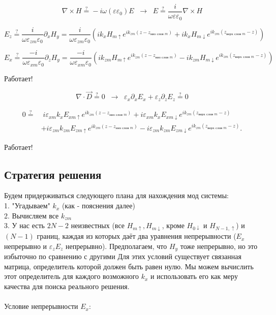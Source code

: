 \documentclass{article}
\begin{document}
$$
\nabla \times H \stackrel{?}{=} -i \omega (\varepsilon \varepsilon_0) E \;\; \rightarrow \;\; E \stackrel{?}{=} \frac{i}{\omega \varepsilon \varepsilon_0} \nabla \times H
$$

$$
E_z \stackrel{?}{=} \frac{i}{\omega \varepsilon_{zm} \varepsilon_0} \partial_x H_y
= \frac{i}{\omega \varepsilon_{zm} \varepsilon_0} \left( i k_x H_{m\uparrow} e^{i k_{zm} (z-z_{\text{низ слоя } m})} + i k_x H_{m\downarrow} e^{i k_{zm} (z_{\text{верх слоя } m} - z)}\right)
$$

$$
E_x \stackrel{?}{=} \frac{-i}{\omega \varepsilon_{xm} \varepsilon_0} \partial_z H_y
= \frac{-i}{\omega \varepsilon_{xm} \varepsilon_0} \left( i k_{zm} H_{m\uparrow} e^{i k_{zm} (z-z_{\text{низ слоя } m})} - i k_{zm} H_{m\downarrow} e^{i k_{zm} (z_{\text{верх слоя } m} - z)}\right)
$$

Работает!

$$
\nabla \cdot \vec{D} \stackrel{?}{=} 0 \;\; \rightarrow \;\; \varepsilon_x \partial_x E_x + \varepsilon_z \partial_z E_z \stackrel{?}{=} 0
$$

\begin{equation}
\begin{aligned}
0 \stackrel{?}{=} &\; i \varepsilon_{xm} k_x E_{xm\uparrow} e^{i k_{zm} (z - z_{\text{низ слоя } m})}
+ i \varepsilon_{xm} k_x E_{xm\downarrow} e^{i k_{zm} (z_{\text{верх слоя } m} - z)} \\
&+ i \varepsilon_{zm} k_{zm} E_{zm\uparrow} e^{i k_{zm} (z - z_{\text{низ слоя } m})}
- i \varepsilon_{zm} k_{zm} E_{zm\downarrow} e^{i k_{zm} (z_{\text{верх слоя } m} - z)}.
\end{aligned}
\end{equation}

Работает!


\subsection{Стратегия решения}
Будем придерживаться следующего плана для нахождения мод системы:
\\
1. "Угадываем" $k_x$ (как - пояснения далее) \\
2. Вычисляем все $k_{zm}$ \\
3. У нас есть $2N-2$ неизвестных (все $H_{m\uparrow}, H_{m\downarrow}$, кроме $H_{0\downarrow}$ и $H_{N-1,\uparrow}$) и $(N-1)$ границ, каждая из которых даёт два уравнения непрерывности ($E_x$ непрерывно и $\varepsilon_z E_z$ непрерывно). Предполагаем, что $H_y$ тоже непрерывно, но это избыточно по сравнению с другими Для этих условий существует связанная матрица, определитель которой должен быть равен нулю. Мы можем вычислить этот определитель для каждого возможного $k_x$ и использовать его как меру качества для поиска реального решения.
\\
\\
Условие непрерывности $E_x$:
\end{document}
